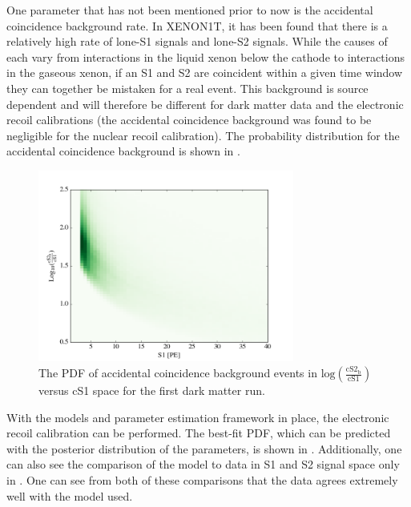 One parameter that has not been mentioned prior to now is the accidental coincidence background rate.  In XENON1T, it has been found that there is a relatively high rate of lone-S1 signals and lone-S2 signals.  While the causes of each vary from interactions in the liquid xenon below the cathode to interactions in the gaseous xenon, if an S1 and S2 are coincident within a given time window they can together be mistaken for a real event.  This background is source dependent and will therefore be different for dark matter data and the electronic recoil calibrations (the accidental coincidence background was found to be negligible for the nuclear recoil calibration).  The probability distribution for the accidental coincidence background is shown in .

\begin{figure}[t]
	\centering
	\includegraphics[width=0.75\textwidth]{xe1t_ac_bkg}
	\caption{The PDF of accidental coincidence background events in $\textrm{log} \left( \frac{\textrm{cS2}_{\textrm{b}}}{\textrm{cS1}} \right)$ versus cS1 space for the first dark matter run.}
	\label{fig:xe1t_ac_bkg}
\end{figure}



With the models and parameter estimation framework in place, the electronic recoil calibration can be performed.  The best-fit PDF, which can be predicted with the posterior distribution of the parameters, is shown in .  Additionally, one can also see the comparison of the model to data in S1 and S2 signal space only in .  One can see from both of these comparisons that the  data agrees extremely well with the model used.


